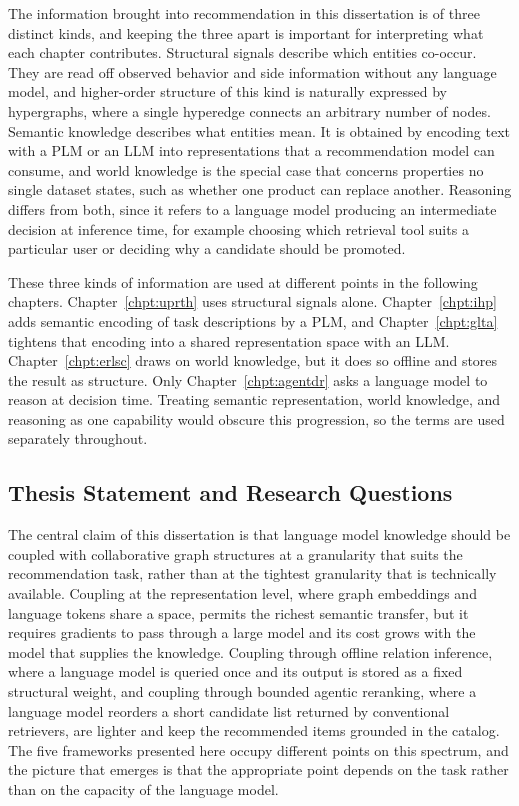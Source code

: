 The information brought into recommendation in this dissertation is of three distinct kinds, and keeping the three apart is important for interpreting what each chapter contributes. Structural signals describe which entities co-occur. They are read off observed behavior and side information without any language model, and higher-order structure of this kind is naturally expressed by hypergraphs, where a single hyperedge connects an arbitrary number of nodes. Semantic knowledge describes what entities mean. It is obtained by encoding text with a PLM or an LLM into representations that a recommendation model can consume, and world knowledge is the special case that concerns properties no single dataset states, such as whether one product can replace another. Reasoning differs from both, since it refers to a language model producing an intermediate decision at inference time, for example choosing which retrieval tool suits a particular user or deciding why a candidate should be promoted.

These three kinds of information are used at different points in the following chapters. Chapter~\ref{chpt:uprth} uses structural signals alone. Chapter~\ref{chpt:ihp} adds semantic encoding of task descriptions by a PLM, and Chapter~\ref{chpt:glta} tightens that encoding into a shared representation space with an LLM. Chapter~\ref{chpt:erlsc} draws on world knowledge, but it does so offline and stores the result as structure. Only Chapter~\ref{chpt:agentdr} asks a language model to reason at decision time. Treating semantic representation, world knowledge, and reasoning as one capability would obscure this progression, so the terms are used separately throughout.

\subsection{Thesis Statement and Research Questions}

The central claim of this dissertation is that language model knowledge should be coupled with collaborative graph structures at a granularity that suits the recommendation task, rather than at the tightest granularity that is technically available. Coupling at the representation level, where graph embeddings and language tokens share a space, permits the richest semantic transfer, but it requires gradients to pass through a large model and its cost grows with the model that supplies the knowledge. Coupling through offline relation inference, where a language model is queried once and its output is stored as a fixed structural weight, and coupling through bounded agentic reranking, where a language model reorders a short candidate list returned by conventional retrievers, are lighter and keep the recommended items grounded in the catalog. The five frameworks presented here occupy different points on this spectrum, and the picture that emerges is that the appropriate point depends on the task rather than on the capacity of the language model.

